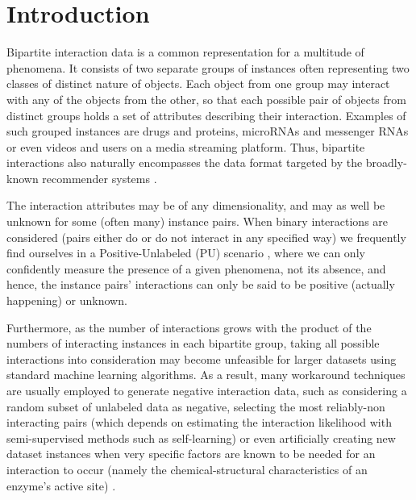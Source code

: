 
\chapter[Introduction]{Introduction}
\label{sec:introduction}

Bipartite interaction data is a common representation for a multitude of
phenomena. It consists of two separate groups of instances often representing
two classes of distinct nature of objects. Each object from one group may
interact with any of the objects from the other, so that each possible pair of
objects from distinct groups holds a set of attributes describing their
interaction. Examples of such grouped instances are drugs and proteins,
microRNAs and messenger RNAs or even videos and users on a media streaming
platform. Thus, bipartite interactions also naturally encompasses the data
format targeted by the broadly-known recommender systems \cite{}.


The interaction attributes may be of any dimensionality, and may as well be
unknown for some (often many) instance pairs. When binary interactions are
considered (pairs either do or do not interact in any specified way) we
frequently find ourselves in a Positive-Unlabeled (PU) scenario \cite{}, where
we can only confidently measure the presence of a given phenomena, not its
absence, and hence, the instance pairs' interactions can only be said to be
positive (actually happening) or unknown.


Furthermore, as the number of interactions grows with the product of the numbers
of interacting instances in each bipartite group, taking all possible
interactions into consideration may become unfeasible for larger datasets using
standard machine learning algorithms. As a result, many workaround techniques
are usually employed to generate negative interaction data, such as considering
a random subset of unlabeled data as negative\cite{Zhang_2018, Zitnik_2018,
Huang_2021}, selecting the most reliably-non interacting pairs (which depends on
estimating the interaction likelihood with semi-supervised methods such as
self-learning)\cite{} or even artificially creating new dataset instances when
very specific factors are known to be needed for an interaction to occur (namely
the chemical-structural characteristics of an enzyme's active site) \cite{}.

